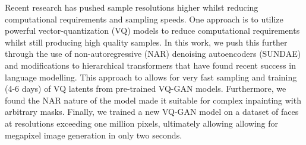 

Recent research has pushed sample resolutions higher whilst reducing
computational requirements and sampling speeds. One approach is to utilize
powerful vector-quantization (VQ) models to reduce computational requirements
whilst still producing high quality samples. In this work, we push this further
through the use of non-autoregressive (NAR) denoising autoencoders (SUNDAE) and
modifications to hierarchical transformers that have found recent success in
language modelling. This approach to allows for very fast sampling and training
(4-6 days) of VQ latents from pre-trained VQ-GAN models. Furthermore, we found
the NAR nature of the model made it suitable for complex
inpainting with arbitrary masks. Finally, we trained a new VQ-GAN model on a
dataset of faces at resolutions exceeding one million pixels, ultimately
allowing allowing for megapixel image generation in only two seconds.




